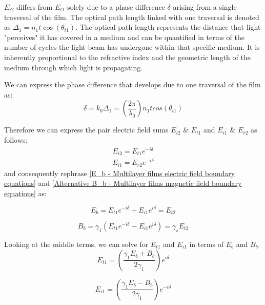 $E_{i2}$ differs from $E_{t1}$ solely due to a phase difference $\delta$ arising from a single traversal of the film. The optical path length linked with one traversal is denoted as $\Delta_1=n_1t\cos(\theta_{t1})$. The optical path length represents the distance that light "perceives" it has covered in a medium and can be quantified in terms of the number of cycles the light beam has undergone within that specific medium. It is inherently proportional to the refractive index and the geometric length of the medium through which light is propagating. %

We can express the phase difference that develops due to one traversal of the film as:
    \begin{equation} \label{phase difference}
    \delta = k_0\Delta_1 = \left(\frac{2\pi}{\lambda_0}\right) n_1tcos(\theta_{t1})
    \end{equation}

Therefore we can express the pair electric field sums $E_{i2}$ \& $E_{t1}$ and $E_{i1}$ \& $E_{r2}$ as follows:
    \begin{align*}
        E_{i2} = E_{t1}e^{-i\delta} \\
        E_{i1} = E_{r2}e^{-i\delta}
    \end{align*}
and consequently rephrase \ref{E_b - Multilayer films electric field boundary equations} and \ref{Alternative B_b - Multilayer films magnetic field boundary equations} as:

    \begin{equation} \label{E_b form after phase difference}
    E_b = E_{t1}e^{-i\delta} + E_{i1}e^{i\delta} = E_{t2}
    \end{equation}
    
    \begin{equation} \label{B_b form after phase difference}
    B_b = \gamma_1(E_{t1}e^{-i\delta} - E_{i1}e^{i\delta}) = \gamma_sE_{t2}
    \end{equation}

Looking at the middle terms, we can solve for $E_{t1}$ and $E_{i1}$ in terms of $E_b$ and $B_b$.
    \begin{equation} \label{E_t1}
    E_{t1} = \left(\frac{\gamma_1E_b + B_b}{2\gamma_1}\right)e^{i\delta}
    \end{equation}
    
    \begin{equation} \label{E_i1}
    E_{i1} = \left(\frac{\gamma_1E_b - B_b}{2\gamma_1}\right)e^{-i\delta}
    \end{equation}

